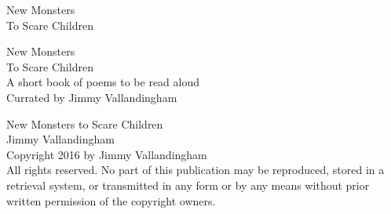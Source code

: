 \documentclass[10pt]{book}
\newcommand\blankpage{%
    \null
    \thispagestyle{empty}%
    \addtocounter{page}{-1}%
    \newpage}
\begin{document}




  \pagestyle{empty}
  \vspace*{\fill}
  \begin{center}
  \huge{\textsf{New Monsters}}\\
  \huge{\textsf{To Scare Children}}\\[0.5cm]
  \end{center}
  \vspace*{\fill}

  \begin{titlepage}
    \vspace*{\fill}
    \begin{center}
      \huge{\textsf{New Monsters}}\\
      \huge{\textsf{To Scare Children}}\\[0.5cm]
      \vspace*{\fill}
      \large {A short book of poems to be read aloud}\\[0.4cm]
      \large {Currated by Jimmy Vallandingham}\\[0.4cm]
    \end{center}
    \vspace*{\fill}
  \end{titlepage}

  \begingroup
  \footnotesize
  \parindent 0pt
  \parskip \baselineskip
  \vfill
  New Monsters to Scare Children\\
  Jimmy Vallandingham \\


  Copyright \textcopyright{} 2016 by Jimmy Vallandingham \\

  All rights reserved. No part of this publication may be reproduced, stored in a retrieval system, or transmitted in any form or by any means without prior written permission of the copyright owners.
\end{document}
